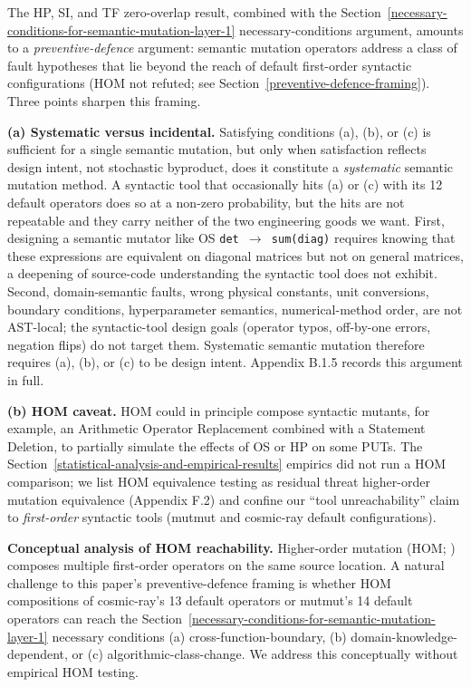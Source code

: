 \documentclass[12pt]{article}
\begin{document}
The HP, SI, and TF zero-overlap result, combined with the Section~\ref{necessary-conditions-for-semantic-mutation-layer-1}
necessary-conditions argument, amounts to a \emph{preventive-defence}
argument: semantic mutation operators address a class of fault
hypotheses that lie beyond the reach of default first-order syntactic
configurations (HOM not refuted; see Section~\ref{preventive-defence-framing}). Three points sharpen
this framing.

\textbf{(a) Systematic versus incidental.} Satisfying conditions (a),
(b), or (c) is sufficient for a single semantic mutation, but only when
satisfaction reflects design intent, not stochastic byproduct, does it
constitute a \emph{systematic} semantic mutation method. A syntactic
tool that occasionally hits (a) or (c) with its 12 default operators
does so at a non-zero probability, but the hits are not repeatable and
they carry neither of the two engineering goods we want. First,
designing a semantic mutator like OS \texttt{det\ $\to$\ sum(diag)} requires
knowing that these expressions are equivalent on diagonal matrices but
not on general matrices, a deepening of source-code understanding the
syntactic tool does not exhibit. Second, domain-semantic faults, wrong
physical constants, unit conversions, boundary conditions,
hyperparameter semantics, numerical-method order, are not AST-local; the
syntactic-tool design goals (operator typos, off-by-one errors, negation
flips) do not target them. Systematic semantic mutation therefore
requires (a), (b), or (c) to be design intent. Appendix B.1.5 records
this argument in full.

\textbf{(b) HOM caveat.} HOM \citep{c03829bdd1a6e45113092384bf0fa05a064ca54a,kintis2018effective}
could in principle compose syntactic mutants, for example, an Arithmetic
Operator Replacement combined with a Statement Deletion, to partially
simulate the effects of OS or HP on some PUTs. The Section~\ref{statistical-analysis-and-empirical-results} empirics did not
run a HOM comparison; we list HOM equivalence testing as residual threat
higher-order mutation equivalence (Appendix F.2) and confine our ``tool unreachability'' claim to
\emph{first-order} syntactic tools (mutmut and cosmic-ray default
configurations).

\textbf{Conceptual analysis of HOM reachability.} Higher-order mutation
(HOM; \citealp{jia2008subtle,c03829bdd1a6e45113092384bf0fa05a064ca54a,kintis2018effective}) composes multiple first-order operators on the same
source location. A natural challenge to this paper's preventive-defence
framing is whether HOM compositions of cosmic-ray's
13 default operators or mutmut's 14 default operators can reach the Section~\ref{necessary-conditions-for-semantic-mutation-layer-1}
necessary conditions (a) cross-function-boundary, (b)
domain-knowledge-dependent, or (c) algorithmic-class-change. We address
this conceptually without empirical HOM testing.
\end{document}
